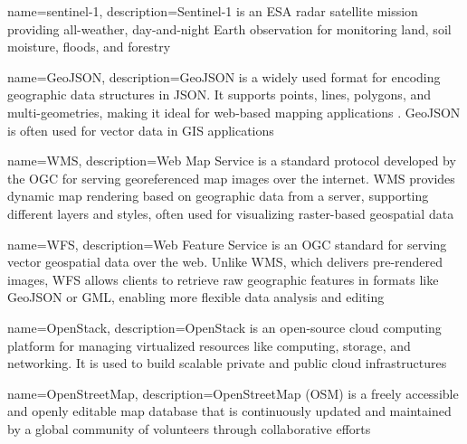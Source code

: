 {
    name=sentinel-1,
    description={Sentinel-1 is an ESA radar satellite mission providing all-weather, day-and-night Earth observation for monitoring land, soil moisture, floods, and forestry \cite{esa_sentinel-1}}
}

{
    name=GeoJSON,
    description={GeoJSON is a widely used format for encoding geographic data structures in JSON. It supports points, lines, polygons, and multi-geometries, making it ideal for web-based mapping applications \cite{geojson}. GeoJSON is often used for vector data in GIS applications}
}

{
    name=WMS,
    description={Web Map Service is a standard protocol developed by the OGC for serving georeferenced map images over the internet. WMS provides dynamic map rendering based on geographic data from a server, supporting different layers and styles, often used for visualizing raster-based geospatial data \cite{ogc2006wms}}
}

{
    name=WFS,
    description={Web Feature Service is an OGC standard for serving vector geospatial data over the web. Unlike WMS, which delivers pre-rendered images, WFS allows clients to retrieve raw geographic features in formats like GeoJSON or GML, enabling more flexible data analysis and editing \cite{ogc2005wfs}}
}

{
    name=OpenStack,
    description={OpenStack is an open-source cloud computing platform for managing virtualized resources like computing, storage, and networking. It is used to build scalable private and public cloud infrastructures \cite{openstack}}
}

{
    name=OpenStreetMap,
    description={OpenStreetMap (OSM) is a freely accessible and openly editable map database that is continuously updated and maintained by a global community of volunteers through collaborative efforts \cite{openstreetmap}}
}





